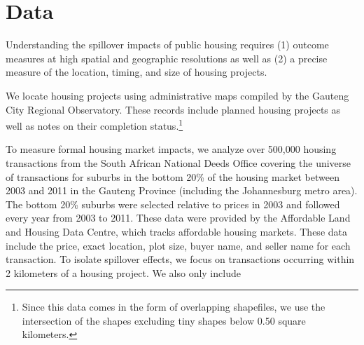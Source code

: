 \documentclass[12pt]{article}
\begin{document}

\section{Data}\label{section:data}

Understanding the spillover impacts of public housing requires (1) outcome measures at high spatial and geographic resolutions as well as (2) a precise measure of the location, timing, and size of housing projects.  


We locate housing projects using administrative maps compiled by the Gauteng City Regional Observatory.  These records include planned housing projects as well as notes on their completion status.\footnote{Since this data comes in the form of overlapping shapefiles, we use the intersection of the shapes excluding tiny shapes below 0.50 square kilometers.}  

To measure formal housing market impacts, we analyze over 500,000 housing transactions from the South African National Deeds Office covering the universe of transactions for suburbs in the bottom 20\% of the housing market between 2003 and 2011 in the Gauteng Province (including the Johannesburg metro area).  The bottom 20\% suburbs were selected relative to prices in 2003 and followed every year from 2003 to 2011.  These data were provided by the Affordable Land and Housing Data Centre, which tracks affordable housing markets.  These data include the price, exact location, plot size, buyer name, and seller name for each transaction.  To isolate spillover effects, we focus on transactions occurring within 2 kilometers of a housing project.  We also only include 
\end{document}

